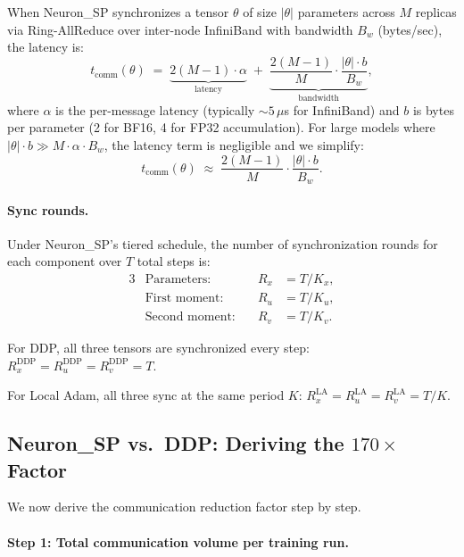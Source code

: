 \documentclass{article}
\begin{document}
When Neuron\_SP synchronizes a tensor $\theta$ of size $|\theta|$
parameters across $M$ replicas via Ring-AllReduce over inter-node
InfiniBand with bandwidth $B_w$ (bytes/sec), the latency is:
\begin{equation}
t_{\text{comm}}(\theta) \;=\;
\underbrace{2(M-1) \cdot \alpha}_{\text{latency}}
\;+\; \underbrace{\frac{2(M-1)}{M} \cdot
\frac{|\theta| \cdot b}{B_w}}_{\text{bandwidth}},
\label{eq:t_comm}
\end{equation}
where $\alpha$ is the per-message latency (typically $\sim 5\,\mu$s for
InfiniBand) and $b$ is bytes per parameter (2 for BF16, 4 for FP32
accumulation). For large models where
$|\theta| \cdot b \gg M \cdot \alpha \cdot B_w$, the latency term is
negligible and we simplify:
\begin{equation}
t_{\text{comm}}(\theta)
\;\approx\; \frac{2(M-1)}{M} \cdot \frac{|\theta| \cdot b}{B_w}.
\label{eq:t_comm_approx}
\end{equation}

\paragraph{Sync rounds.}
Under Neuron\_SP's tiered schedule, the number of synchronization rounds
for each component over $T$ total steps is:
\begin{alignat}{3}
&\text{Parameters:}\quad& R_x &= T / K_x, \label{eq:Rx} \\
&\text{First moment:}\quad& R_u &= T / K_u, \label{eq:Ru} \\
&\text{Second moment:}\quad& R_v &= T / K_v. \label{eq:Rv}
\end{alignat}

For DDP, all three tensors are synchronized every step:
$R_x^{\text{DDP}} = R_u^{\text{DDP}} = R_v^{\text{DDP}} = T$.

For Local Adam, all three sync at the same period $K$:
$R_x^{\text{LA}} = R_u^{\text{LA}} = R_v^{\text{LA}} = T/K$.

\subsection{Neuron\_SP vs.\ DDP: Deriving the $170\times$ Factor}

We now derive the communication reduction factor step by step.

\paragraph{Step 1: Total communication volume per training run.}
\end{document}
